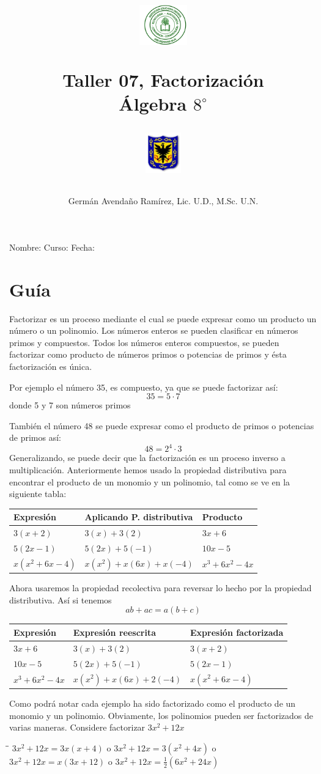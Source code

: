 \documentclass[10pt,twoside]{article}
\author{Germ\'an Avenda\~no Ram\'irez, Lic. U.D., M.Sc. U.N.}
\title{\begin{minipage}{.2\textwidth}
\includegraphics[height=1.75cm]{Images/logo-colegio.png}\end{minipage}
\begin{minipage}{.55\textwidth}
\begin{center}
Taller 07, Factorización  \\
Álgebra $8^{\circ}$
\end{center}
\end{minipage}\hfill
\begin{minipage}{.2\textwidth}
\includegraphics[height=1.75cm]{Images/logo-sed.png} 
\end{minipage}}
\date{}
\begin{document}
\maketitle
Nombre: \hrulefill Curso: \underline{\hspace*{44pt}} Fecha: \underline{\hspace*{2.5cm}}
\section*{Gu\'{i}a}
Factorizar es un proceso mediante el cual se puede expresar como un producto un número o un polinomio. Los números enteros se pueden clasificar en números primos y compuestos. Todos los números enteros compuestos, se pueden factorizar como producto de números primos o potencias de primos y ésta factorización es única.

Por ejemplo el número 35, es compuesto, ya que se puede factorizar así:
\[35=5\cdot 7\]
donde 5 y 7 son números primos

También el número 48 se puede expresar como el producto de primos o potencias de primos así:
\[48=2^{4}\cdot 3\]
Generalizando, se puede decir que la factorización es un proceso inverso a multiplicación. Anteriormente hemos usado la propiedad distributiva para encontrar el producto de un monomio y un polinomio, tal como se ve en la siguiente tabla:
\begin{center}
\begin{tabular}{l|l|l}
\hline 
Expresión & Aplicando P. distributiva & Producto \\ \hline
$3(x+2)$ & $3(x)+3(2)$ & $3x+6$ \\ 
$5(2x-1)$ & $5(2x)+5(-1)$ & $10x-5$ \\ 
$x(x^{2}+6x-4)$ & $x(x^{2})+x(6x)+x(-4)$ & $x^{3}+6x^{2}-4x$ \\ 
\hline 
\end{tabular} 
\end{center}
Ahora usaremos la propiedad recolectiva para reversar lo hecho por la propiedad distributiva. Así si tenemos 
\[ab+ac=a(b+c)\]
\begin{center}
\begin{tabular}{l|l|l}
\hline 
Expresión & Expresión reescrita & Expresión factorizada \\ \hline
$3x+6$ & $3(x)+3(2)$ & $3(x+2)$ \\ 
$10x-5$ & $5(2x)+5(-1)$ & $5(2x-1)$ \\ 
$x^{3}+6x^{2}-4x$ & $x(x^{2})+x(6x)+2(-4)$ & $x(x^{2}+6x-4)$ \\ 
\hline 
\end{tabular} 
\end{center}
Como podrá notar cada ejemplo ha sido factorizado como el producto de un monomio y un polinomio. Obviamente, los polinomios pueden ser factorizados de varias maneras. Considere factorizar $3x^{2}+12x$
\begin{tabbing}
\hspace{4cm}\=\hspace{1cm}\=\kill
$3x^{2}+12x=3x(x+4)$ \> o \> $3x^{2}+12x=3(x^{2}+4x)$ \hspace*{1cm} o \\ 
$3x^{2}+12x=x(3x+12)$ \> o \> $3x^{2}+12x=\frac{1}{2}(6x^{2}+24x)$ 
\end{tabbing} 
\end{document}
